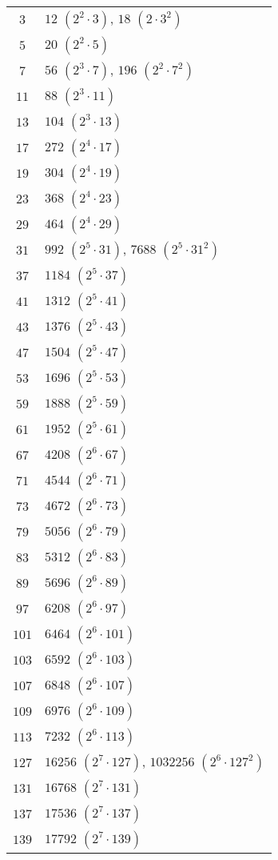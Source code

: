 \documentclass[12pt]{article}
\begin{document}
\begin{tabular}
{| c | l |}
$3$ & $12$ $(2^2 \cdot 3)$, $18$ $(2 \cdot 3^2)$ \\
$5$ & $20$ $(2^2 \cdot 5)$ \\
$7$ & $56$ $(2^3 \cdot 7)$, $196$ $(2^2 \cdot 7^2)$ \\
$11$ & $88$ $(2^3 \cdot 11)$ \\
$13$ & $104$ $(2^3 \cdot 13)$ \\
$17$ & $272$ $(2^4 \cdot 17)$ \\
$19$ & $304$ $(2^4 \cdot 19)$ \\
$23$ & $368$ $(2^4 \cdot 23)$ \\
$29$ & $464$ $(2^4 \cdot 29)$ \\
$31$ & $992$ $(2^5 \cdot 31)$, $7688$ $(2^5 \cdot 31^2)$ \\
$37$ & $1184$ $(2^5 \cdot 37)$ \\
$41$ & $1312$ $(2^5 \cdot 41)$ \\
$43$ & $1376$ $(2^5 \cdot 43)$ \\
$47$ & $1504$ $(2^5 \cdot 47)$ \\
$53$ & $1696$ $(2^5 \cdot 53)$ \\
$59$ & $1888$ $(2^5 \cdot 59)$ \\
$61$ & $1952$ $(2^5 \cdot 61)$ \\
$67$ & $4208$ $(2^6 \cdot 67)$ \\
$71$ & $4544$ $(2^6 \cdot 71)$ \\
$73$ & $4672$ $(2^6 \cdot 73)$ \\
$79$ & $5056$ $(2^6 \cdot 79)$ \\
$83$ & $5312$ $(2^6 \cdot 83)$ \\
$89$ & $5696$ $(2^6 \cdot 89)$ \\
$97$ & $6208$ $(2^6 \cdot 97)$ \\
$101$ & $6464$ $(2^6 \cdot 101)$ \\
$103$ & $6592$ $(2^6 \cdot 103)$ \\
$107$ & $6848$ $(2^6 \cdot 107)$ \\
$109$ & $6976$ $(2^6 \cdot 109)$ \\
$113$ & $7232$ $(2^6 \cdot 113)$ \\
$127$ & $16256$ $(2^7 \cdot 127)$, $1032256$ $(2^6 \cdot 127^2)$ \\
$131$ & $16768$ $(2^7 \cdot 131)$ \\
$137$ & $17536$ $(2^7 \cdot 137)$ \\
$139$ & $17792$ $(2^7 \cdot 139)$ \\

\end{tabular}
\end{document}
